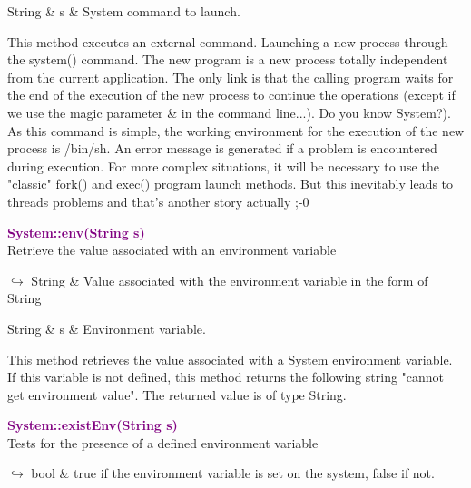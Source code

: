 \begin{tcolorbox}[width=\textwidth,myArgs,tabularx={ll|R}]
String & s & System command to launch.
\end{tcolorbox}

This method executes an external command. Launching a new process through the system() command.
The new program is a new process totally independent from the current application.
The only link is that the calling program waits for the end of the execution of the new process to continue the operations (except if we use the magic parameter \& in the command line...).
Do you know System?). As this command is simple, the working environment for the execution of the new process is /bin/sh. An error message is generated if a problem is encountered during execution.
For more complex situations, it will be necessary to use the "classic" fork() and exec() program launch methods. But this inevitably leads to threads problems and that's another story actually ;-0

\textcolor{purple}{\textbf{System::env(String s)}}\label{System::env(String s)}\\
Retrieve the value associated with an environment variable\vspace*{-0.5em}
\begin{tcolorbox}[grow to left by=-1cm, width=\textwidth-1cm,myArgs,tabularx={l|R}]
$\hookrightarrow$ String & Value associated with the environment variable in the form of String
\end{tcolorbox}

\begin{tcolorbox}[width=\textwidth,myArgs,tabularx={ll|R}]
String & s & Environment variable.
\end{tcolorbox}

This method retrieves the value associated with a System environment variable. If this variable is not defined, this method returns the following string "cannot get environment value". The returned value is of type String.

\textcolor{purple}{\textbf{System::existEnv(String s)}}\label{System::existEnv(String s)}\\
Tests for the presence of a defined environment variable\vspace*{-0.5em}
\begin{tcolorbox}[grow to left by=-1cm, width=\textwidth-1cm,myArgs,tabularx={l|R}]
$\hookrightarrow$ bool & true if the environment variable is set on the system, false if not.
\end{tcolorbox}

